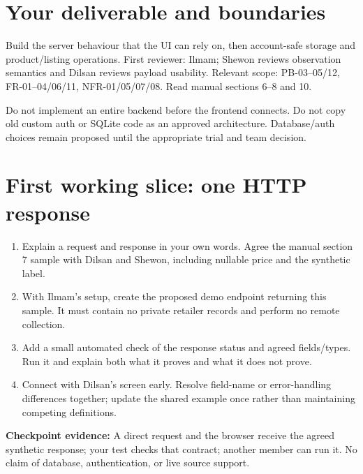 
\sharedintro
\section*{Your deliverable and boundaries}
Build the server behaviour that the UI can rely on, then account-safe storage and product/listing operations. First reviewer: Ilmam; Shewon reviews observation semantics and Dilsan reviews payload usability. Relevant scope: PB-03--05/12, FR-01--04/06/11, NFR-01/05/07/08. Read manual sections 6--8 and 10.

Do not implement an entire backend before the frontend connects. Do not copy old custom auth or SQLite code as an approved architecture. Database/auth choices remain proposed until the appropriate trial and team decision.
\section*{First working slice: one HTTP response}
\begin{enumerate}
\item Explain a request and response in your own words. Agree the manual section 7 sample with Dilsan and Shewon, including nullable price and the synthetic label.
\item With Ilmam's setup, create the proposed demo endpoint returning this sample. It must contain no private retailer records and perform no remote collection.
\item Add a small automated check of the response status and agreed fields/types. Run it and explain both what it proves and what it does not prove.
\item Connect with Dilsan's screen early. Resolve field-name or error-handling differences together; update the shared example once rather than maintaining competing definitions.
\end{enumerate}
\textbf{Checkpoint evidence:} A direct request and the browser receive the agreed synthetic response; your test checks that contract; another member can run it. No claim of database, authentication, or live source support.
\newpage
